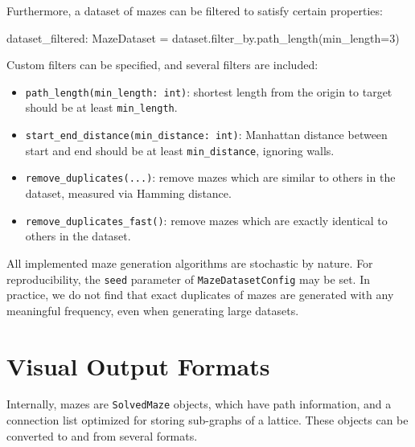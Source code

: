 \documentclass[10pt,a4paper,onecolumn]{article}
\newenvironment{Shaded}{}{}
\newcommand{\DecValTok}[1]{\textcolor[rgb]{0.25,0.63,0.44}{#1}}
\newcommand{\NormalTok}[1]{#1}
\newcommand{\OperatorTok}[1]{\textcolor[rgb]{0.40,0.40,0.40}{#1}}
\providecommand{\tightlist}{%
  \setlength{\itemsep}{0pt}\setlength{\parskip}{0pt}}
\begin{document}
Furthermore, a dataset of mazes can be filtered to satisfy certain
properties:

\begin{Shaded}
\begin{Highlighting}[]
\NormalTok{dataset\_filtered: MazeDataset }\OperatorTok{=}\NormalTok{ dataset.filter\_by.path\_length(min\_length}\OperatorTok{=}\DecValTok{3}\NormalTok{)}
\end{Highlighting}
\end{Shaded}

Custom filters can be specified, and several filters are included:

\begin{itemize}
\tightlist
\item
  \texttt{path\_length(min\_length:\ int)}: shortest length from the
  origin to target should be at least \texttt{min\_length}.
\item
  \texttt{start\_end\_distance(min\_distance:\ int)}: Manhattan distance
  between start and end should be at least \texttt{min\_distance},
  ignoring walls.
\item
  \texttt{remove\_duplicates(...)}: remove mazes which are similar to
  others in the dataset, measured via Hamming distance.
\item
  \texttt{remove\_duplicates\_fast()}: remove mazes which are exactly
  identical to others in the dataset.
\end{itemize}

All implemented maze generation algorithms are stochastic by nature. For
reproducibility, the \texttt{seed} parameter of
\texttt{MazeDatasetConfig} may be set. In practice, we do not find that
exact duplicates of mazes are generated with any meaningful frequency,
even when generating large datasets.

\hypertarget{visual-output-formats}{%
\section{Visual Output Formats}\label{visual-output-formats}}

Internally, mazes are \texttt{SolvedMaze} objects, which have path
information, and a connection list optimized for storing sub-graphs of a
lattice. These objects can be converted to and from several formats.
\end{document}
